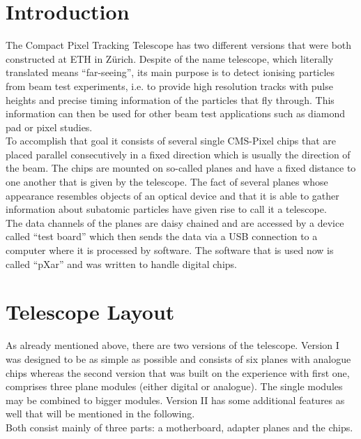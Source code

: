 
\section{Introduction}\label{s20}
The Compact Pixel Tracking Telescope has two different versions that were both constructed at \ac{ETH} in Zürich. Despite of the name telescope, which literally translated means ``far-seeing'', its main purpose is to detect ionising particles from beam test experiments, i.e. to provide high resolution tracks with pulse heights and precise timing information of the particles that fly through. This information can then be used for other beam test applications such as diamond pad or pixel studies.\\ 
To accomplish that goal it consists of several single \ac{CMS}-Pixel chips that are placed parallel consecutively in a fixed direction which is usually the direction of the beam. The chips are mounted on so-called planes and have a fixed distance to one another that is given by the telescope. The fact of several planes whose appearance resembles objects of an optical device and that it is able to gather information about subatomic particles have given rise to call it a telescope.\\
The data channels of the planes are daisy chained and are accessed by a device called ``test board'' which then sends the data via a USB connection to a computer where it is processed by software. The software that is used now is called ``pXar'' and was written to handle digital chips.
\section{Telescope Layout}\label{s21}
As already mentioned above, there are two versions of the telescope. Version I was designed to be as simple as possible and consists of six planes with analogue chips whereas the second version that was built on the experience with first one, comprises three plane modules (either digital or analogue). The single modules may be combined to bigger modules. Version II has some additional features as well that will be mentioned in the following.\\
Both consist mainly of three parts: a motherboard, adapter planes and the chips.
